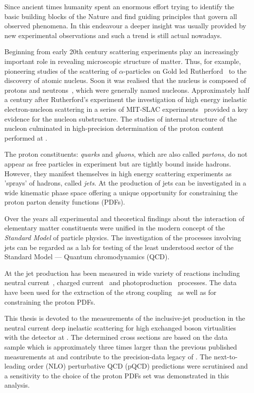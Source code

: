 Since ancient times humanity spent an enormous effort trying to identify the basic building blocks of the Nature and find guiding principles that govern all observed phenomena. In this endeavour a deeper insight was usually provided by new experimental observations and such a trend is still actual nowadays.

Beginning from early 20th century scattering experiments play an increasingly important role in revealing microscopic structure of matter. Thus, for example, pioneering studies of the scattering of $\alpha$-particles on Gold led Rutherford~\cite{rutherford} to the discovery of atomic nucleus. Soon it was realised that the nucleus is composed of protons and neutrons~\cite{Chadwick}, which were generally named nucleons. Approximately half a century after Rutherford's experiment the investigation of high energy inelastic electron-nucleon scattering in a series of MIT-SLAC experiments~\cite{slac} provided a key evidence for the nucleon substructure. The studies of internal structure of the nucleon culminated in high-precision determination of the proton content performed at \hera.

The proton constituents: \emph{quarks} and \emph{gluons}, which are also called \emph{partons}, do not appear as free particles in experiment but are tightly bound inside hadrons. However, they manifest themselves in high energy scattering experiments as 'sprays' of hadrons, called \emph{jets}. At \hera the production of jets can be investigated in a wide kinematic phase space offering a unique opportunity for constraining the proton parton density functions (PDFs).

Over the years all experimental and theoretical findings about the interaction of elementary matter constituents were unified in the modern concept of the \emph{Standard Model} of particle physics. The investigation of the processes involving jets can be regarded as a lab for testing of the least understood sector of the Standard Model --- Quantum chromodynamics (QCD).

At \hera the jet production has been measured in wide variety of reactions including neutral current~\cite{ncjets}, charged current~\cite{ccjets} and photoproduction~\cite{phpjets} processes. The data have been used for the extraction of the strong coupling~\cite{jets} as well as for constraining the proton PDFs.

This thesis is devoted to the measurements of the inclusive-jet production in the neutral current deep inelastic scattering for high exchanged boson virtualities with the \zeus detector at \hera. The determined cross sections are based on the data sample which is approximately three times larger than the previous published measurements at \zeus and contribute to the precision-data legacy of \hera. The next-to-leading order (NLO) perturbative QCD (pQCD) predictions were scrutinised and a sensitivity to the choice of the proton PDFs set was demonstrated in this analysis.

